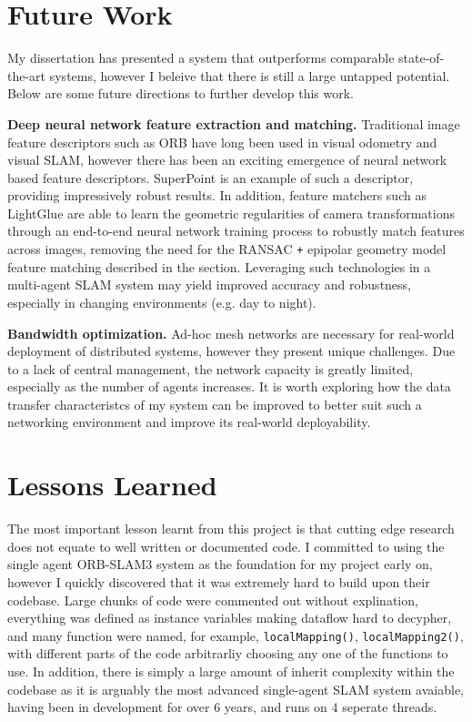 

\label{sec:5}

\section{Future Work}
\label{sec:future-work}
My dissertation has presented a system that outperforms comparable state-of-the-art systems, however I beleive that there is still a large untapped potential. Below are some future directions to further develop this work.

\textbf{Deep neural network feature extraction and matching.} Traditional image feature descriptors such as ORB have long been used in visual odometry and visual SLAM, however there has been an exciting emergence of neural network based feature descriptors. SuperPoint \autocite{detone18superpoint} is an example of such a descriptor, providing impressively robust results. In addition, feature matchers such as LightGlue \autocite{lindenberger2023lightglue} are able to learn the geometric regularities of camera transformations through an end-to-end neural network training process to robustly match features across images, removing the need for the RANSAC \texttt{+} epipolar geometry model feature matching described in the  section. Leveraging such technologies in a multi-agent SLAM system may yield improved accuracy and robustness, especially in changing environments (e.g. day to night).

\textbf{Bandwidth optimization.} Ad-hoc mesh networks are necessary for real-world deployment of distributed systems, however they present unique challenges. Due to a lack of central management, the network capacity is greatly limited, especially as the number of agents increases. It is worth exploring how the data transfer characteristcs of my system can be improved to better suit such a networking environment and improve its real-world deployability.

\section{Lessons Learned}
\label{sec:lessons-learned}
The most important lesson learnt from this project is that cutting edge research does not equate to well written or documented code. I committed to using the single agent ORB-SLAM3 system as the foundation for my project early on, however I quickly discovered that it was extremely hard to build upon their codebase. Large chunks of code were commented out without explination, everything was defined as instance variables making dataflow hard to decypher, and many function were named, for example, \texttt{localMapping()}, \texttt{localMapping2()}, with different parts of the code arbitrarliy choosing any one of the functions to use. In addition, there is simply a large amount of inherit complexity within the codebase as it is arguably the most advanced single-agent SLAM system avaiable, having been in development for over 6 years, and runs on 4 seperate threads.


